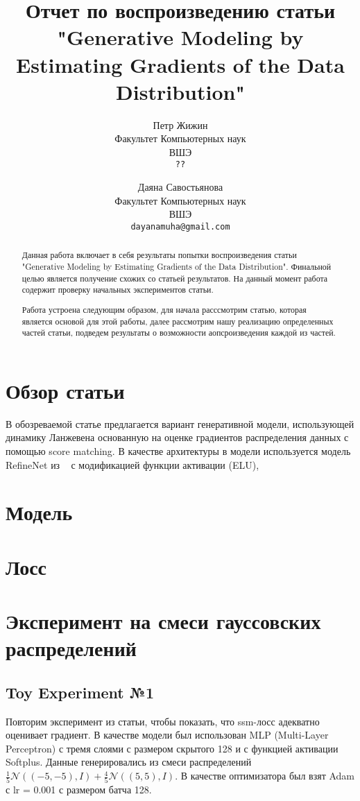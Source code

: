 \documentclass{article}
\title{Отчет по воспроизведению статьи "Generative Modeling by Estimating Gradients of the Data Distribution"}
\author{%
  Петр Жижин \\
  Факультет Компьютерных наук\\
  ВШЭ\\
  \texttt{??} \\
   \and
   Даяна Савостьянова \\
   Факультет Компьютерных наук\\
   ВШЭ\\
   \texttt{dayanamuha@gmail.com} \\
}
\begin{document}

\maketitle

\begin{abstract}
  Данная работа включает в себя результаты попытки воспроизведения статьи 
  "Generative Modeling by Estimating Gradients of the Data Distribution". Финальной целью является получение схожих со статьей результатов. На данный момент работа содержит проверку начальных экспериментов статьи.
  
  Работа устроена следующим образом, для начала расссмотрим статью, которая является основой для этой работы, далее рассмотрим нашу реализацию определенных частей статьи, подведем результаты о возможности аопсроизведения каждой из частей.
\end{abstract}


\section{Обзор статьи}

В обозреваемой статье предлагается вариант генеративной модели, использующей динамику Ланжевена основанную на оценке градиентов распределения данных с помощью score matching. В качестве архитектуры в модели используется модель RefineNet из ~\cite{DBLP:journals/corr/LinMS016} с модификацией функции активации (ELU), 

\section{Модель}

\section{Лосс}

\section{Эксперимент на смеси гауссовских распределений}

\subsection{Toy Experiment №1}
Повторим эксперимент из статьи, чтобы показать, что ssm-лосс адекватно оценивает градиент. В качестве модели был использован MLP (Multi-Layer Perceptron) с тремя слоями с размером скрытого 128 и с функцией активации Softplus. Данные генерировались из смеси распределений 
$\frac{1}{5} \mathcal{N}\left( \left( -5, -5\right), I \right)+\frac{4}{5} \mathcal{N}\left( \left( 5, 5\right), I \right)$. В качестве оптимизатора был взят Adam с lr = 0.001 с размером батча 128. 
\end{document}
